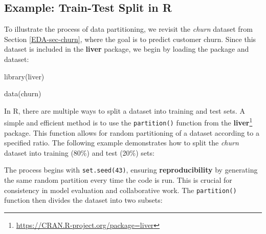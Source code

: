\documentclass[
  11pt,
]{book}
\makeatletter
\newenvironment{Shaded}{}{}
\newcommand{\AttributeTok}[1]{#1}
\newcommand{\DecValTok}[1]{#1}
\newcommand{\FloatTok}[1]{#1}
\newcommand{\FunctionTok}[1]{#1}
\newcommand{\NormalTok}[1]{#1}
\newcommand{\OtherTok}[1]{\textcolor[rgb]{0.39,0.39,0.39}{#1}}
\newcommand{\SpecialCharTok}[1]{\textcolor[rgb]{0.39,0.39,0.39}{#1}}
\renewcommand{\href}[2]{#2\footnote{\url{#1}}}
\newenvironment{kframe}{%
\medskip{}
\setlength{\fboxsep}{.8em}
 \def\at@end@of@kframe{}%
 \ifinner\ifhmode%
  \def\at@end@of@kframe{\end{minipage}}%
  \begin{minipage}{\columnwidth}%
 \fi\fi%
 \def\FrameCommand##1{\hskip\@totalleftmargin \hskip-\fboxsep
 \colorbox{shadecolor}{##1}\hskip-\fboxsep
     \hskip-\linewidth \hskip-\@totalleftmargin \hskip\columnwidth}%
 \MakeFramed {\advance\hsize-\width
   \@totalleftmargin\z@ \linewidth\hsize
   \@setminipage}}%
 {\par\unskip\endMakeFramed%
 \at@end@of@kframe}
\renewenvironment{Shaded}{\begin{kframe}}{\end{kframe}}
\theoremstyle{definition}
\theoremstyle{definition}
\theoremstyle{definition}
\theoremstyle{definition}
\theoremstyle{remark}
\makeatother
\begin{document}
\subsection*{Example: Train-Test Split in R}\label{example-train-test-split-in-r}


To illustrate the process of data partitioning, we revisit the \emph{churn} dataset from Section \ref{EDA-sec-churn}, where the goal is to predict customer churn. Since this dataset is included in the \textbf{liver} package, we begin by loading the package and dataset:

\begin{Shaded}
\begin{Highlighting}[]
\FunctionTok{library}\NormalTok{(liver)}

\FunctionTok{data}\NormalTok{(churn) }
\end{Highlighting}
\end{Shaded}

In R, there are multiple ways to split a dataset into training and test sets. A simple and efficient method is to use the \texttt{partition()} function from the \href{https://CRAN.R-project.org/package=liver}{\textbf{liver}} package. This function allows for random partitioning of a dataset according to a specified ratio. The following example demonstrates how to split the \emph{churn} dataset into training (80\%) and test (20\%) sets:

\begin{Shaded}
\end{Shaded}

The process begins with \texttt{set.seed(43)}, ensuring \textbf{reproducibility} by generating the same random partition every time the code is run. This is crucial for consistency in model evaluation and collaborative work. The \texttt{partition()} function then divides the dataset into two subsets:
\end{document}
